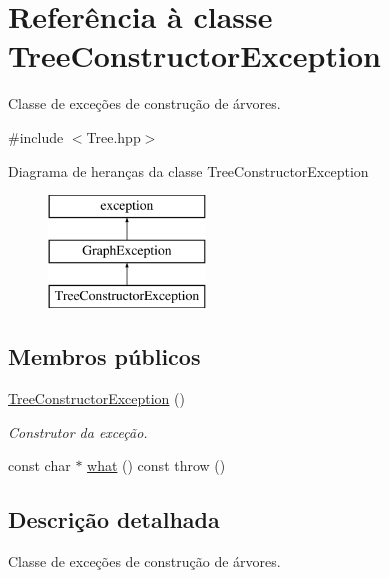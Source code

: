 \hypertarget{classTreeConstructorException}{}\section{Referência à classe Tree\+Constructor\+Exception}
\label{classTreeConstructorException}


Classe de exceções de construção de árvores.  




{\ttfamily \#include $<$Tree.\+hpp$>$}

Diagrama de heranças da classe Tree\+Constructor\+Exception\begin{figure}[H]
\begin{center}
\leavevmode
\includegraphics[height=3.000000cm]{classTreeConstructorException}
\end{center}
\end{figure}
\subsection*{Membros públicos}
\begin{DoxyCompactItemize}
\item 
\mbox{\label{classTreeConstructorException_a2ecb31ba568ce3480ef9db767468f310}} 
\hyperlink{classTreeConstructorException_a2ecb31ba568ce3480ef9db767468f310}{Tree\+Constructor\+Exception} ()
\begin{DoxyCompactList}\small\item\em Construtor da exceção. \end{DoxyCompactList}\item 
const char $\ast$ \hyperlink{classTreeConstructorException_acc8b569a2ad401614e1d8a9f6b0bd5d8}{what} () const  throw ()
\end{DoxyCompactItemize}


\subsection{Descrição detalhada}
Classe de exceções de construção de árvores. 

